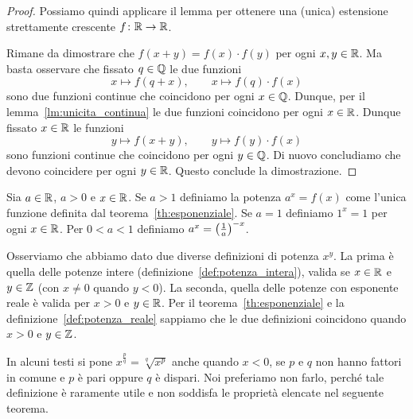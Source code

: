 \begin{proof}
Possiamo quindi applicare il lemma
per ottenere una (unica) estensione
strettamente crescente $f\colon \mathbb R\to\mathbb R$.

Rimane da dimostrare che $f(x+y)=f(x)\cdot f(y)$
per ogni $x,y\in \mathbb R$. Ma basta osservare che
fissato $q\in \mathbb Q$ le due funzioni
\[
  x \mapsto f(q+x), \qquad x \mapsto f(q)\cdot f(x)
\]
sono due funzioni continue che coincidono
per ogni $x\in \mathbb Q$.
Dunque, per il lemma~\ref{lm:unicita_continua}
le due funzioni coincidono per ogni $x\in \mathbb R$.
Dunque fissato $x\in \mathbb R$ le funzioni
\[
 y\mapsto f(x+y), \qquad y \mapsto f(y)\cdot f(x)
\]
sono funzioni continue che coincidono per
ogni $y\in \mathbb Q$. Di nuovo concludiamo che
devono coincidere per ogni $y\in \mathbb R$.
Questo conclude la dimostrazione.
\end{proof}

\begin{definition}
\label{def:potenza_reale}%
%
Sia $a\in \mathbb R$, $a>0$ e $x\in \mathbb R$.
Se $a>1$ definiamo la potenza $a^x = f(x)$ come
l'unica funzione definita dal teorema~\ref{th:esponenziale}.
Se $a=1$ definiamo $1^x=1$ per ogni $x\in \mathbb R$.
Per $0<a<1$ definiamo
$a^x = {\left( \frac{1}{a} \right)}^{-x}$.
\end{definition}

Osserviamo che abbiamo dato due diverse definizioni di potenza
$x^y$.
La prima è quella delle potenze intere (definizione~\ref{def:potenza_intera}),
valida se $x\in \mathbb R$ e $y\in \mathbb Z$
(con $x\neq 0$ quando $y<0$).
La seconda, quella delle potenze con esponente
reale è valida per $x>0$ e $y\in \mathbb R$.
Per il teorema~\ref{th:esponenziale} e la
definizione~\ref{def:potenza_reale}
sappiamo che le due definizioni coincidono quando
$x>0$ e $y\in \mathbb Z$.

In alcuni testi si pone $x^{\frac pq}=\sqrt[q]{x^p}$
anche quando $x<0$, se $p$ e $q$ non hanno fattori in comune
e $p$ è pari oppure $q$ è dispari.
Noi preferiamo non farlo, perché tale definizione
è raramente utile e non soddisfa le proprietà
elencate nel seguente teorema.

